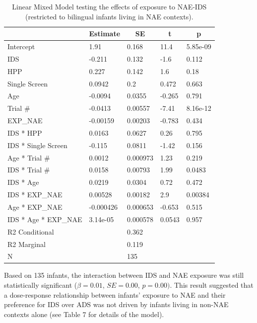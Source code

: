 \documentclass[
  english,
  ,man,floatsintext]{apa6}
\begin{document}
\begin{table}[tbp]
\begin{center}
\begin{threeparttable}
\caption{\label{tab:unnamed-chunk-17}Linear Mixed Model testing the effects of exposure to NAE-IDS (restricted to bilingual infants living in NAE contexts).}
\begin{tabular}{lllll}
\toprule
 & \multicolumn{1}{c}{Estimate} & \multicolumn{1}{c}{SE} & \multicolumn{1}{c}{t} & \multicolumn{1}{c}{p}\\
\midrule
Intercept & 1.91 & 0.168 & 11.4 & 5.85e-09\\
IDS & -0.211 & 0.132 & -1.6 & 0.112\\
HPP & 0.227 & 0.142 & 1.6 & 0.18\\
Single Screen & 0.0942 & 0.2 & 0.472 & 0.663\\
Age & -0.0094 & 0.0355 & -0.265 & 0.791\\
Trial \# & -0.0413 & 0.00557 & -7.41 & 8.16e-12\\
EXP\_NAE & -0.00159 & 0.00203 & -0.783 & 0.434\\
IDS * HPP & 0.0163 & 0.0627 & 0.26 & 0.795\\
IDS * Single Screen & -0.115 & 0.0811 & -1.42 & 0.156\\
Age * Trial \# & 0.0012 & 0.000973 & 1.23 & 0.219\\
IDS * Trial \# & 0.0158 & 0.00793 & 1.99 & 0.0483\\
IDS * Age & 0.0219 & 0.0304 & 0.72 & 0.472\\
IDS * EXP\_NAE & 0.00528 & 0.00182 & 2.9 & 0.00384\\
Age * EXP\_NAE & -0.000426 & 0.000653 & -0.653 & 0.515\\
IDS * Age * EXP\_NAE & 3.14e-05 & 0.000578 & 0.0543 & 0.957\\ \midrule
R2 Conditional &  & 0.362 &  & \\
R2 Marginal &  & 0.119 &  & \\ \midrule
N &  & 135 &  & \\
\bottomrule
\end{tabular}
\end{threeparttable}
\end{center}
\end{table}

Based on 135 infants, the interaction between IDS and NAE exposure was still statistically significant (\(\beta = 0.01\), \(SE = 0.00\), \(p = 0.00)\). This result suggested that a dose-response relationship between infants' exposure to NAE and their preference for IDS over ADS was not driven by infants living in non-NAE contexts alone (see Table 7 for details of the model).
\end{document}
